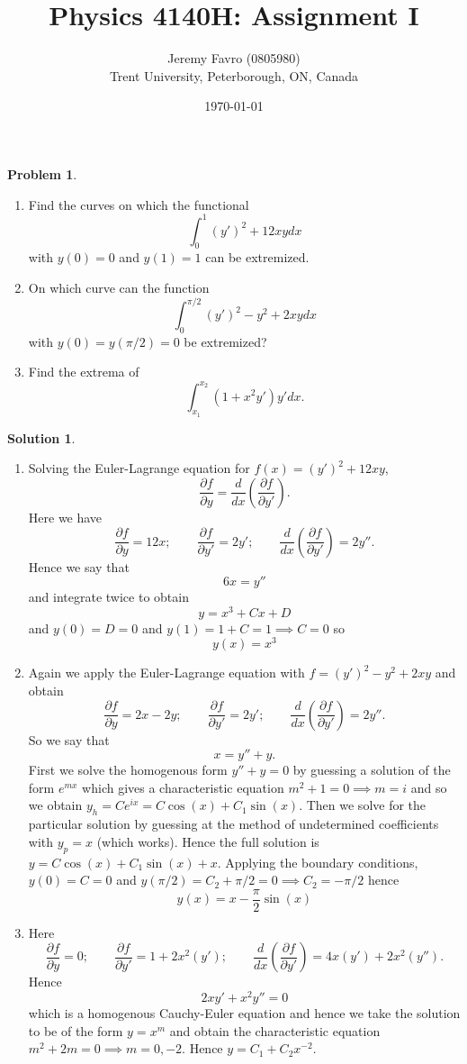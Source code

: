 \documentclass[10pt]{article}
\title{Physics 4140H: Assignment I}
\author{Jeremy Favro (0805980) \\ Trent University, Peterborough, ON, Canada}
\date{\today}
\theoremstyle{definition}
\newtheorem{problem}{Problem}
\newtheorem{soln}{Solution}
\begin{document}
\maketitle

\begin{problem}~
\begin{enumerate}[label=(\alph*)]
  \item Find the curves on which the functional $$\int_{0}^{1}(y')^2+12xydx$$
        with $y(0)=0$ and $y(1)=1$ can be extremized.
  \item On which curve can the function $$\int_{0}^{\pi/2}(y')^2-y^2+2xydx$$
        with $y(0)=y(\pi/2)=0$ be extremized?
  \item Find the extrema of $$\int_{x_1}^{x_2}(1+x^2y')y'dx.$$
\end{enumerate}
\end{problem}
\begin{soln}~
  \begin{enumerate}[label=(\alph*)]
    \item Solving the Euler-Lagrange equation for $f(x)=(y')^2+12xy$,
          $$\frac{\partial f}{\partial y}=\frac{d}{dx}\left(\frac{\partial f}{\partial y'}\right).$$
          Here we have
          $$\frac{\partial f}{\partial y}=12x;\qquad \frac{\partial f}{\partial y'}=2y';\qquad \frac{d}{dx}\left(\frac{\partial f}{\partial y'}\right)=2y''.$$
          Hence we say that
          $$6x=y''$$ and integrate twice to obtain
          $$y=x^3+Cx+D$$
          and $y(0)=D=0$ and $y(1)=1+C=1\implies C=0$ so
          $$y(x)=x^3$$
    \item Again we apply the Euler-Lagrange equation with $f=(y')^2-y^2+2xy$ and obtain
          $$\frac{\partial f}{\partial y}=2x-2y;\qquad \frac{\partial f}{\partial y'}=2y';\qquad \frac{d}{dx}\left(\frac{\partial f}{\partial y'}\right)=2y''.$$
          So we say that
          $$x=y''+y.$$
          First we solve the homogenous form $y''+y=0$ by guessing a solution of the form $e^{mx}$ which gives a characteristic equation $m^2+1=0\implies m=i$
          and so we obtain $y_h=Ce^{ix}=C\cos(x)+C_1\sin(x)$. Then we solve for the particular solution by guessing at the method of undetermined coefficients with
          $y_p=x$ (which works). Hence the full solution is $y=C\cos(x)+C_1\sin(x)+x$. Applying the boundary conditions, $y(0)=C=0$ and $y(\pi/2)=C_2+\pi/2=0\implies C_2=-\pi/2$ hence
          $$y(x)=x-\frac{\pi}{2}\sin(x)$$
    \item Here
          $$\frac{\partial f}{\partial y}=0;\qquad \frac{\partial f}{\partial y'}=1+2x^2(y');\qquad \frac{d}{dx}\left(\frac{\partial f}{\partial y'}\right)=4x(y')+2x^2(y'').$$
          Hence
          $$2xy'+x^2y''=0$$
          which is a homogenous Cauchy-Euler equation and hence we take the solution to be of the form $y=x^m$ and obtain the characteristic equation
          $m^2+2m=0\implies m=0,-2$. Hence $y=C_1+C_2x^{-2}$.
  \end{enumerate}
\end{soln}
\end{document}
